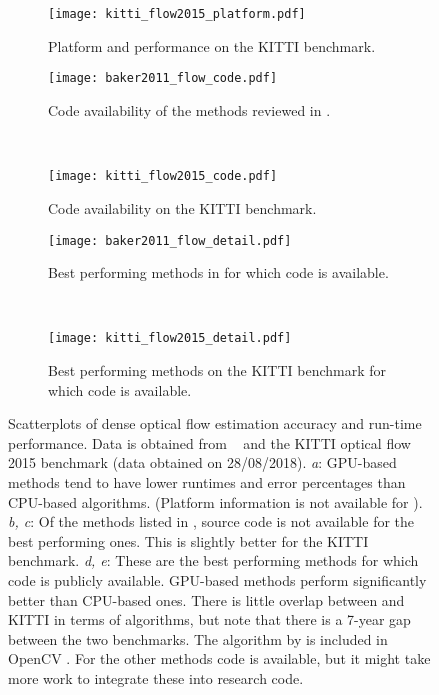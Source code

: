 \begin{figure}
\centering
\begin{subfigure}[t]{0.45\textwidth}
\ %
\end{subfigure}
~
\begin{subfigure}[t]{0.45\textwidth}
\texttt{[image: kitti\_flow2015\_platform.pdf]}
\caption{Platform and performance on the KITTI benchmark.}
\end{subfigure}

\begin{subfigure}[t]{0.45\textwidth}
\texttt{[image: baker2011\_flow\_code.pdf]}
\caption{Code availability of the methods reviewed in .}
\end{subfigure}
~
\begin{subfigure}[t]{0.45\textwidth}
\texttt{[image: kitti\_flow2015\_code.pdf]}
\caption{Code availability on the KITTI benchmark.}
\end{subfigure}

\begin{subfigure}[t]{0.45\textwidth}
\texttt{[image: baker2011\_flow\_detail.pdf]}
\caption{Best performing methods in  for which code is available.}
\end{subfigure}
~
\begin{subfigure}[t]{0.45\textwidth}
\texttt{[image: kitti\_flow2015\_detail.pdf]}
\caption{Best performing methods on the KITTI benchmark for which code is available.}
\end{subfigure}
\caption{Scatterplots of dense optical flow estimation accuracy and run-time performance. Data is obtained from ~\cite{Baker2011} and the KITTI optical flow 2015 benchmark \cite{Menze2015} (data obtained on 28/08/2018).
\emph{a}: GPU-based methods tend to have lower runtimes and error percentages than CPU-based algorithms. (Platform information is not available for ).
\emph{b, c}: Of the methods listed in , source code is not available for the best performing ones. This is slightly better for the KITTI benchmark.
\emph{d, e}: These are the best performing methods for which code is publicly available. GPU-based methods perform significantly better than CPU-based ones. There is little overlap between  and KITTI in terms of algorithms, but note that there is a 7-year gap between the two benchmarks. The algorithm by \citeauthor{Brox2004} is included in OpenCV \cite{Brox2004}. For the other methods code is available, but it might take more work to integrate these into research code.}
\label{fig:flow_benchmark}
\end{figure}

